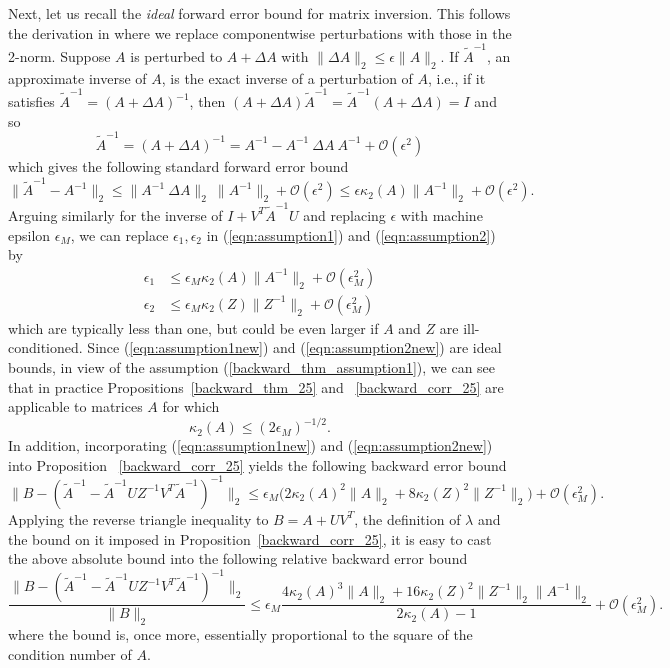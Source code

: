 \documentclass{siamltex}
\newcommand{\eqnref}[1]{(\ref{#1})}
\newcommand{\eps}{\epsilon}
\begin{document}
Next, let us recall the {\em ideal} forward error bound for matrix inversion. This follows the derivation in \cite[p. 261]{Higham02} where we replace componentwise perturbations with those in the 2-norm. Suppose $A$ is perturbed to $A + \Delta A$ with $\|\Delta A\|_2 \leq \eps \|A\|_2$. If $\tilde{A}^{-1}$, an approximate inverse of $A$, is the exact inverse of a perturbation of $A$, i.e., if it satisfies $\tilde{A}^{-1} = (A+ \Delta A)^{-1}$, then $(A+ \Delta A) \tilde{A}^{-1} = \tilde{A}^{-1} (A+ \Delta A) = I$ and so
 \[
\tilde{A}^{-1} = (A+ \Delta A)^{-1} = A^{-1} - A^{-1} \ \Delta A \ A^{-1} + \mathcal{O}(\eps^2)
 \]
 which gives the following standard forward error bound
\[
\|\tilde{A}^{-1} - A^{-1} \|_2 \leq  \| A^{-1} \ \Delta A\|_2 \ \|A^{-1} \|_2 + \mathcal{O}(\eps^2)
\leq \eps \kappa_2(A) \| A^{-1} \|_2 + \mathcal{O}(\eps^2).
\]
Arguing similarly for the inverse of $I + V^T \tilde{A}^{-1} U$ and replacing $\eps$ with machine epsilon $\eps_M$, we can replace $\epsilon_1, \epsilon_2$ in \eqnref{eqn:assumption1} and \eqnref{eqn:assumption2} by
\begin{align}
\epsilon_1 &\leq \eps_M \kappa_2(A) \| A^{-1} \|_2 + \mathcal{O}(\eps_M^2) \label{eqn:assumption1new} \\
\epsilon_2 & \leq \eps_M \kappa_2(Z) \|Z^{-1} \|_2 + \mathcal{O}(\eps_M^2)\label{eqn:assumption2new} 
\end{align}
which are typically less than one, but could be even larger if $A$ and $Z$ are ill-conditioned. Since 
\eqnref{eqn:assumption1new} and \eqnref{eqn:assumption2new} are ideal bounds, in view of the assumption \eqnref{backward_thm_assumption1}, we can see that in practice Propositions~\ref{backward_thm_25} and ~\ref{backward_corr_25} are applicable to matrices $A$ for which 
\[
\kappa_2(A) \leq (2 \eps_M)^{-1/2}.
\]
In addition, incorporating \eqnref{eqn:assumption1new} and \eqnref{eqn:assumption2new} into Proposition 
~\ref{backward_corr_25} yields the following backward error bound
\begin{equation*}
\| B -\left(\widetilde{A}^{-1} - \widetilde{A}^{-1} U Z^{-1} V^T \widetilde{A}^{-1}\right)^{-1}\|_2 \leq \eps_M 
\Big( 2 \kappa_2(A)^2\|A\|_2 + 8 \kappa_2(Z)^2 \|Z^{-1}\|_2 \Big) + \mathcal{O}(\eps_M^2).
\end{equation*}   
Applying the reverse triangle inequality to $B = A + UV^T$, the definition of $\lambda$ and the bound on it imposed in Proposition~\ref{backward_corr_25}, it is easy to cast the above absolute bound into the following relative backward error bound 
\begin{equation*}
\frac{\| B -\left(\widetilde{A}^{-1} - \widetilde{A}^{-1} U Z^{-1} V^T \widetilde{A}^{-1}\right)^{-1}\|_2}{\|B\|_2} \leq \eps_M \frac{4 \kappa_2(A)^3\|A\|_2 + 16 \kappa_2(Z)^2 \|Z^{-1}\|_2 \|A^{-1}\|_2}{2\kappa_2(A) - 1} + \mathcal{O}(\eps_M^2).
\end{equation*}   
where the bound is, once more, essentially proportional to the square of the condition number of $A$.
\end{document}

